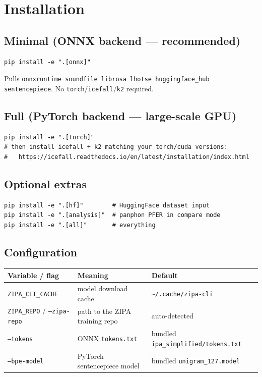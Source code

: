 \documentclass[11pt,a4paper]{article}
\newcommand{\code}[1]{\texttt{#1}}
\begin{document}
\section{Installation}

\subsection{Minimal (ONNX backend --- recommended)}
\begin{lstlisting}
pip install -e ".[onnx]"
\end{lstlisting}
Pulls \code{onnxruntime soundfile librosa lhotse huggingface\_hub sentencepiece}. No
\code{torch}/\code{icefall}/\code{k2} required.

\subsection{Full (PyTorch backend --- large-scale GPU)}
\begin{lstlisting}
pip install -e ".[torch]"
# then install icefall + k2 matching your torch/cuda versions:
#   https://icefall.readthedocs.io/en/latest/installation/index.html
\end{lstlisting}

\subsection{Optional extras}
\begin{lstlisting}
pip install -e ".[hf]"        # HuggingFace dataset input
pip install -e ".[analysis]"  # panphon PFER in compare mode
pip install -e ".[all]"       # everything
\end{lstlisting}

\subsection{Configuration}
\begin{longtable}{@{}lll@{}}
\toprule
\textbf{Variable / flag} & \textbf{Meaning} & \textbf{Default} \\
\midrule
\endhead
\code{ZIPA\_CLI\_CACHE} & model download cache & \code{\textasciitilde/.cache/zipa-cli} \\
\code{ZIPA\_REPO} / \code{--zipa-repo} & path to the ZIPA training repo & auto-detected \\
\code{--tokens} & ONNX \code{tokens.txt} & bundled \code{ipa\_simplified/tokens.txt} \\
\code{--bpe-model} & PyTorch sentencepiece model & bundled \code{unigram\_127.model} \\
\bottomrule
\end{longtable}
\end{document}
